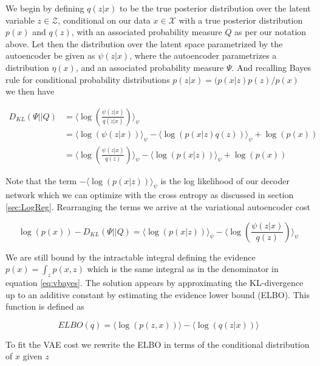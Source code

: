 \noindent We begin by defining $q(z|x)$ to be the true posterior distribution over the latent variable $z \in \mathcal{Z}$, conditional on our data $x \in \mathcal{X}$ with a true posterior distribution $p(x)$ and $q(z)$, with an associated probability measure $Q$ as per our notation above. Let then the distribution over the latent space parametrized by the autoencoder be given as $\psi(z|x)$, where the autoencoder parametrizes a distribution $\eta(x)$, and an associated probability measure $\Psi$. And recalling Bayes rule for conditional probability distributions $p(z | x ) = (p(x | z) p(z) / p(x) $ we then have 

\begin{align}
D_{KL}(\Psi || Q ) &= \langle \log \left(\frac{\psi(z|x)}{q(z|x)}\right) \rangle_\psi \\
&=  \langle \log \left( \psi(z|x)\right) \rangle_\psi - \langle \log \left( p( x | z) q(z) \right) \rangle_\psi + \log \left(p(x) \right) \\
&=  \langle \log \left(\frac{\psi(z|x)}{q(z)} \right) \rangle_\psi - \langle \log \left( p( x | z)\right) \rangle_\psi + \log \left(p(x) \right)
\end{align}

\noindent Note that the term $-\langle \log \left( p( x | z)\right) \rangle_\psi$ is the log likelihood of our decoder network which we can optimize with the cross entropy as discussed in section \ref{sec:LogReg}. Rearranging the terms we arrive at the variational autoencoder cost

\begin{equation}\label{eq:vae_cost}
\log(p(x)) - D_{KL}(\Psi || Q )=  \langle \log \left( p( x | z)\right) \rangle_\psi - \langle \log \left(\frac{\psi(z|x)}{q(z)}\right)\rangle_\psi
\end{equation}
 

\noindent We are still bound by the intractable integral defining the evidence $p(x) = \int_z p(x, z)$ which is the same integral as in the denominator in equation \ref{eq:vbayes}. The solution appears by approximating the KL-divergence up to an additive constant by estimating the evidence lower bound (ELBO). This function is defined as 

\begin{equation}\label{eq:elbo}
ELBO(q) = \langle \log(p(z, x)) \rangle - \langle \log(q(z|x)) \rangle
\end{equation}

\noindent To fit the VAE cost we rewrite the ELBO in terms of the conditional distribution of $x$ given $z$

